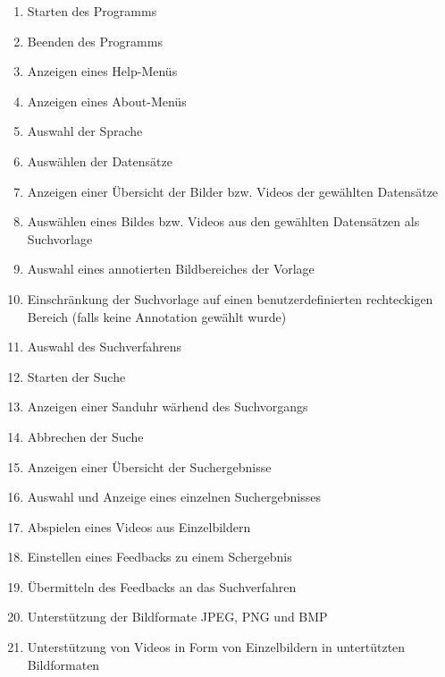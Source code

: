 \begin{enumerate} [label=\bfseries /F \arabic*0/]
	\subsection{Pflicht}
	\item Starten des Programms
	\item Beenden des Programms
	\item Anzeigen eines Help-Menüs
	\item Anzeigen eines About-Menüs
	\item Auswahl der Sprache

	\item Ausw\"ahlen der Datens\"atze
	\item Anzeigen einer Übersicht der Bilder bzw. Videos der gewählten Datensätze
	\item Ausw\"ahlen eines Bildes bzw. Videos aus den gewählten Datensätzen als Suchvorlage
	\item Auswahl eines annotierten Bildbereiches der Vorlage
	\item Einschränkung der Suchvorlage auf einen benutzerdefinierten rechteckigen Bereich (falls keine Annotation gewählt wurde)
	\item Auswahl des Suchverfahrens

	\item Starten der Suche
	\item Anzeigen einer Sanduhr w\"arhend des Suchvorgangs
	\item Abbrechen der Suche

	\item Anzeigen einer \"Ubersicht der Suchergebnisse
	\item Auswahl und Anzeige eines einzelnen Suchergebnisses
	\item Abspielen eines Videos aus Einzelbildern
	\item Einstellen eines Feedbacks zu einem Schergebnis
	\item \"Ubermitteln des Feedbacks an das Suchverfahren

	\item Unterstützung der Bildformate JPEG, PNG und BMP
	\item Unterstützung von Videos in Form von Einzelbildern in untert\"utzten Bildformaten


\end{enumerate}
